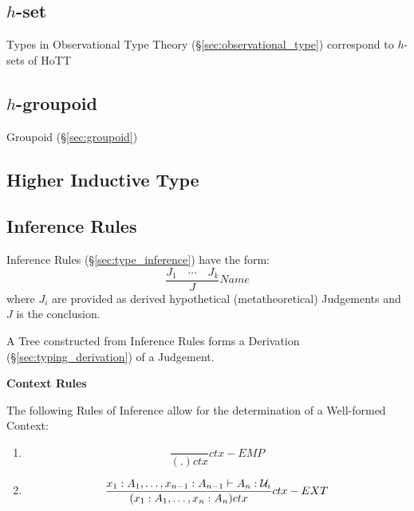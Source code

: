 \subsection{$h$-set}\label{sec:h_set}

Types in Observational Type Theory (\S\ref{sec:observational_type})
correspond to $h$-sets of HoTT



\subsection{$h$-groupoid}\label{sec:h_groupoid}

Groupoid (\S\ref{sec:groupoid})



\subsection{Higher Inductive Type}\label{sec:higher_inductive_type}

\subsection{Inference Rules}\label{sec:homotopy_rules}

Inference Rules (\S\ref{sec:type_inference}) have the form:
\[
  \frac{J_1 \quad \cdots \quad J_k} {J} Name
\]
where $J_i$ are provided as derived hypothetical (metatheoretical)
Judgements and $J$ is the conclusion.

A Tree constructed from Inference Rules forms a Derivation
(\S\ref{sec:typing_derivation}) of a Judgement.



\textbf{Context Rules}

The following Rules of Inference allow for the determination of a
Well-formed Context:
\begin{enumerate}
\item
\[
  {
    \frac{}{(.)ctx}
  } ctx-EMP
\]
\item
\[
  {
    \frac
    {x_1:A_1, \ldots, x_{n-1}:A_{n-1} \vdash A_n : \mathcal{U}_i}
    {(x_1:A_1,\ldots,x_n:A_n) ctx}
  } ctx-EXT
\]
\end{enumerate}



